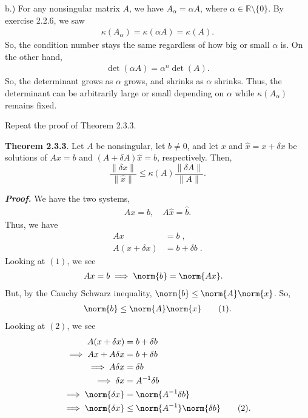 \documentclass{report}
\begin{document}
    \bigbreak \noindent 
    b.)  For any nonsingular matrix $A$, we have $A_{\alpha} = \alpha A$, where $\alpha \in \mathbb{R} \setminus \{0\} $. By exercise 2.2.6, we saw
    \begin{align*}
        \kappa(A_{\alpha}) = \kappa(\alpha A) = \kappa(A)
    .\end{align*}
    So, the condition number stays the same regardless of how big or small $\alpha$ is. On the other hand, 
    \begin{align*}
        \det(\alpha A) = \alpha^{n}\det(A)
    .\end{align*}
    So, the determinant grows as $\alpha$ grows, and shrinks as $\alpha$ shrinks. Thus, the determinant can be arbitrarily large or small depending on $\alpha$ while $\kappa(A_{\alpha})$ remains fixed.


    \bigbreak \noindent 
    \begin{mdframed}
        Repeat the proof of Theorem 2.3.3.
    \end{mdframed}
    \bigbreak \noindent 
    \begin{remark}
        \textbf{Theorem 2.3.3}. 
        Let $A$ be nonsingular, let $b \neq 0$, and let $x$ and $\hat{x} = x + \delta x$ be 
        solutions of $Ax = b$ and $(A + \delta A)\hat{x} = b$, respectively. Then,
        \[
            \frac{\|\delta x\|}{\|\hat{x}\|} 
            \leq \kappa(A) \frac{\|\delta A\|}{\|A\|}.
            \tag{2.3.4}
        \]
    \end{remark}
    \bigbreak \noindent 
    \textbf{\textit{Proof.}}
    We have the two systems,
    \begin{align*}
        Ax = b, \quad A\hat{x} = \hat{b}
    .\end{align*}
    Thus, we have
    \begin{align*}
        Ax &= b\; \tag{1}, \\
        A(x + \delta  x) &= b + \delta  b \; \tag{2}
    .\end{align*}
    Looking at $(1)$, we see
    \begin{align*}
        Ax &= b \implies \norm{b} = \norm{Ax}
    .\end{align*}
    But, by the Cauchy Schwarz inequality, $\norm{b} \leq \norm{A}\norm{x}$. So,
    \begin{align*}
        \norm{b} \leq \norm{A}\norm{x} \tag{1}
    .\end{align*}
    Looking at $(2) $, we see
    \begin{align*}
        A(x + \delta  x) &= b + \delta  b \\
        \implies Ax + A \delta x &= b + \delta  b \\
        \implies A \delta  x &= \delta  b  \\
        \implies \delta x &= A^{-1} \delta  b  \\
        \implies \norm{\delta  x} &= \norm{A^{-1} \delta  b} \\
        \implies \norm{ \delta  x} &\leq \norm{A^{-1}} \norm{\delta  b} \tag{2}
    .\end{align*}
\end{document}
